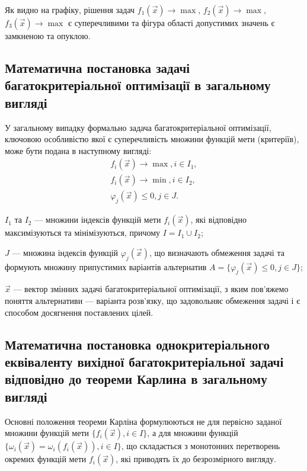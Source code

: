 Як видно на графіку, рішення задач $f_1(\vec{x}) \to \max$, $f_2(\vec{x}) \to \max$, $f_3(\vec{x}) \to \max$ є суперечливими та фігура області допустимих значень є замкненою та опуклою.

\subsection{Математична постановка задачі багатокритеріальної оптимізації в загальному вигляді}

У загальному випадку формально задача багатокритеріальної оптимізації, ключовою особливістю якої є суперечливість множини функцій мети (критеріїв), може бути подана в наступному вигляді:
\begin{gather*} 
    f_i(\vec{x}) \to \max, i \in I_1, \\
    f_i(\vec{x}) \to \min, i \in I_2, \\
    \varphi_j(\vec{x}) \leq 0, j \in J.
\end{gather*}
\begin{description}
    \item[де] $I_1$ та $I_2$ --- множини індексів функцій мети $f_i(\vec{x})$, які відповідно максимізуються та мінімізуються, причому $I=I_1 \cup I_2$;
    \item $J$ --- множина індексів функцій $\varphi_j(\vec{x})$, що визначають обмеження задачі та формують множину припустимих варіантів альтернатив $A = \{ \varphi_j(\vec{x}) \leq 0, j \in J \}$;
    \item $\vec{x}$ --- вектор змінних задачі багатокритеріальної оптимізації, з яким пов’яжемо поняття альтернативи --- варіанта розв’язку, що задовольняє обмеження задачі і є способом досягнення поставлених цілей.
\end{description}

\subsection{Математична постановка однокритеріального еквіваленту вихідної багатокритеріальної задачі відповідно до теореми Карлина в загальному вигляді}

Основні положення теореми Карліна формулюються не для первісно заданої множини функцій мети $\{f_i(\vec{x}),i \in I\}$, а для множини функцій $\{\omega_i(\vec{x})=\omega_i(f_i(\vec{x})), i \in I\}$, що складається з монотонних перетворень окремих функцій мети $f_i(\vec{x})$, які приводять їх до безрозмірного вигляду.

